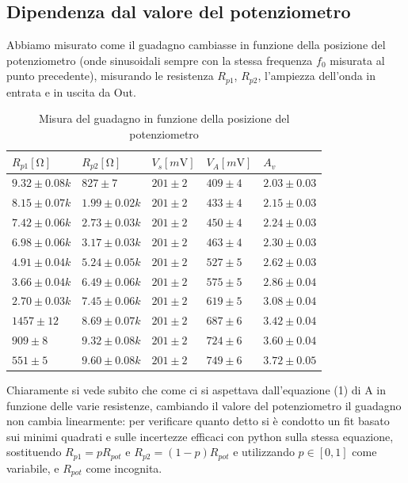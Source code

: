 \documentclass[10pt, a4paper, italian]{article}
\begin{document}
\subsection{Dipendenza dal valore del potenziometro}
Abbiamo misurato come il guadagno cambiasse in funzione della posizione del potenziometro (onde sinusoidali sempre con la stessa frequenza $f_0$ misurata al punto precedente), misurando le resistenza $R_{p1}$, $R_{p2}$, l'ampiezza dell'onda in entrata e in uscita da Out.
\begin{table}[H]
\centering
\begin{tabular}{@{}lllll@{}}
\toprule
$R_{p1} [\si{\ohm}]$  & $R_{p2} [\si{\ohm}]$ & $V_{s} [\si{m\V}]$ & $V_{A} [\si{m\V}]$ & $A_v$ \\
\midrule
$9.32 \pm 0.08 k$ &	$827 \pm 7$	& $201 \pm 2$ 	& $ 409 \pm 4$	& $2.03 \pm 0.03$\\
$8.15 \pm 0.07 k$ &	$1.99 \pm 0.02 k$	& $201 \pm 2$ 	& $ 433 \pm 4$	&$2.15 \pm 0.03$\\
$7.42 \pm 0.06 k$ &	$2.73 \pm 0.03 k$	& $201 \pm 2$ 	&$ 450 \pm 4$	&$2.24 \pm 0.03$\\
$6.98 \pm 0.06 k$ &	$3.17 \pm 0.03 k$	& $201 \pm 2$ 	&	$ 463 \pm 4$&$2.30 \pm 0.03$\\
$4.91 \pm 0.04 k$ &	$5.24 \pm 0.05 k$	& $201 \pm 2$ 	&	$ 527 \pm 5$&$2.62 \pm 0.03$\\
$3.66 \pm 0.04 k$ &	$6.49 \pm 0.06 k$	& $201 \pm 2$ 	&$ 575 \pm 5$	&$2.86 \pm 0.04$\\
$2.70 \pm 0.03 k$ &	$7.45 \pm 0.06 k$	& $201 \pm 2$ 	&$ 619 \pm 5$	&$3.08 \pm 0.04$\\
$1457 \pm 12 $ &	$8.69 \pm 0.07 k$	& $201 \pm 2$ 	&	$ 687 \pm 6$&$3.42 \pm 0.04$\\
$909 \pm 8 $ &	$9.32 \pm 0.08 k$	& $201 \pm 2$ 	&$ 724 \pm 6$	&$3.60 \pm 0.04$\\
$551 \pm 5 $ &	$9.60 \pm 0.08 k$	& $201 \pm 2$ 	&	$ 749 \pm 6$&$3.72 \pm 0.05$\\

\bottomrule
\end{tabular}
\caption{Misura del guadagno in funzione della posizione del potenziometro}
\end{table}
Chiaramente si vede subito che come ci si aspettava dall'equazione (1) di A in funzione delle varie resistenze, cambiando il valore del potenziometro il guadagno non cambia linearmente: per verificare quanto detto si è condotto un fit basato sui minimi quadrati e sulle incertezze efficaci con python sulla stessa equazione, sostituendo $R_{p1} = p R_{pot}$ e $R_{p2}=(1-p)R_{pot}$ e utilizzando $p \in [0,1]$ come variabile, e $R_{pot}$ come incognita.
\end{document}
